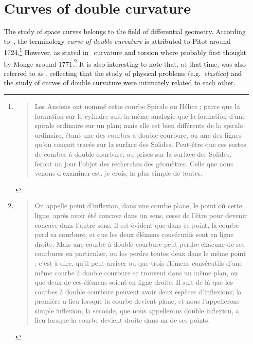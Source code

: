 
\section{Curves of double curvature}

The study of space curves belongs to the field of differential geometry. According to~\cite[p.28]{Delcourt2007}, the terminology \emph{curve of double curvature} is attributed to Pitot around 1724.\footnote{\blockcquote[p.28]{Pitot1726}{Les Anciens ont nommé cette courbe Spirale ou Hélice ; parce que la formation sur le cylindre suit la même analogie que la formation d’une spirale ordinaire sur un plan; mais elle est bien différente de la spirale ordinaire, étant une des courbes à double courbure, ou une des lignes qu’on conçoit tracée sur la surface des Solides. Peut-être que ces sortes de courbes à double courbure, ou prises sur la surface des Solides, feront un jour l’objet des recherches des géomètres. Celle que nous venons d’examiner est, je crois, la plus simple de toutes.
}} However, as stated in~\cite[p.321]{Coolidge2013} curvature and torsion where probably first thought by Monge around 1771.\footnote{\blockcquote[p.363]{Monge1809}{On appelle point d'inflexion, dans une courbe plane, le point où cette ligne, après avoir été concave dans un sens, cesse de l'être pour devenir concave dans l'autre sens. Il est évident que dans ce point, la courbe perd sa courbure, et que les deux élémens consécutifs sont en ligne droite. Mais une courbe à double courbure peut perdre chacune de ses courbures en particulier, ou les perdre toutes deux dans le même point ; c'est-à-dire, qu'il peut arriver ou que trois élémens consécutifs d'une même courbe à double courbure se trouvent dans un même plan, ou que deux de ces élémens soient en ligne droite. Il suit de là que les courbes à double courbure peuvent avoir deux espèces d'inflexions; la première a lieu lorsque la courbe devient plane, et nous l'appellerons simple inflexion; la seconde, que nous appellerons double inflexion, a lieu lorsque la courbe devient droite dans un de ses points.}.} It is also interesting to note that, at that time,  was also referred to as , reflecting that the study of physical problems (e.g.\ \emph{elastica}) and the study of curves of double curvature were intimately related to each other.

